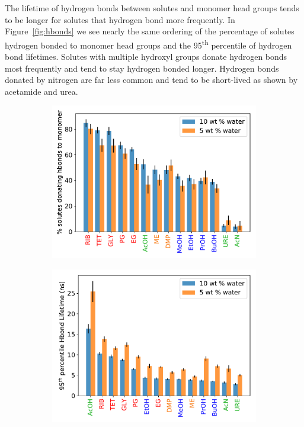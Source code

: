 \documentclass[journal=jpcbfk,manuscript=article]{achemso}
\begin{document}
  The lifetime of hydrogen bonds between solutes and monomer head groups tends to 
  be longer for solutes that hydrogen bond more frequently. In Figure~\ref{fig:hbonds}
  we see nearly the same ordering of the percentage of solutes hydrogen bonded to
  monomer head groups and the 95\textsuperscript{th} percentile of hydrogen bond 
  lifetimes. Solutes with multiple hydroxyl groups donate hydrogen bonds most 
  frequently and tend to stay hydrogen bonded longer. Hydrogen bonds donated by
  nitrogen are far less common and tend to be short-lived as shown by acetamide
  and urea.

  \begin{figure}[!htb]
  \centering
  \begin{subfigure}{0.45\textwidth}
  \includegraphics[width=\textwidth]{nhbonds_all.pdf}  %
  \caption{}\label{fig:nhbonds}
  \end{subfigure}
  \begin{subfigure}{0.45\textwidth}
  \includegraphics[width=\textwidth]{hbond_lifetime.pdf}  %

\end{subfigure}
\end{figure}
\end{document}

